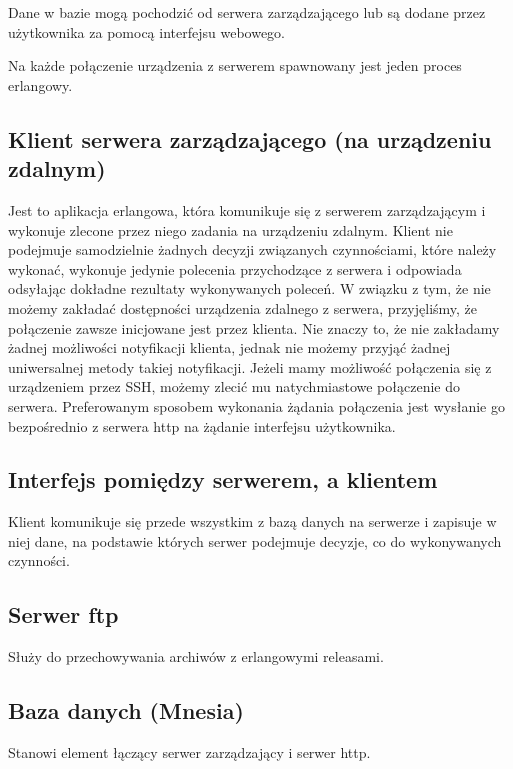 \documentclass[polish,12pt]{aghthesis}
\begin{document}
Dane w bazie mogą pochodzić od serwera zarządzającego lub są dodane przez użytkownika za pomocą interfejsu webowego.

Na każde połączenie urządzenia z serwerem spawnowany jest jeden proces erlangowy.

\subsection{Klient serwera zarządzającego (na urządzeniu zdalnym)}
Jest to aplikacja erlangowa, która komunikuje się z serwerem zarządzającym i wykonuje zlecone przez niego zadania na urządzeniu zdalnym. Klient nie podejmuje samodzielnie żadnych decyzji związanych czynnościami, które należy wykonać, wykonuje jedynie polecenia przychodzące z serwera i odpowiada odsyłając dokładne rezultaty wykonywanych poleceń. W związku z tym, że nie możemy zakładać dostępności urządzenia zdalnego z serwera, przyjęliśmy, że połączenie zawsze inicjowane jest przez klienta. Nie znaczy to, że nie zakładamy żadnej możliwości notyfikacji klienta, jednak nie możemy przyjąć żadnej uniwersalnej metody takiej notyfikacji. Jeżeli mamy możliwość połączenia się z urządzeniem przez SSH, możemy zlecić mu natychmiastowe połączenie do serwera. Preferowanym sposobem wykonania żądania połączenia jest wysłanie go bezpośrednio z serwera http na żądanie interfejsu użytkownika.

\subsection{Interfejs pomiędzy serwerem, a klientem}
Klient komunikuje się przede wszystkim z bazą danych na serwerze i zapisuje w niej dane, na podstawie których serwer podejmuje decyzje, co do wykonywanych czynności.

\subsection{Serwer ftp}
Służy do przechowywania archiwów z erlangowymi releasami.

\subsection{Baza danych (Mnesia)}
Stanowi element łączący serwer zarządzający i serwer http.
\end{document}
